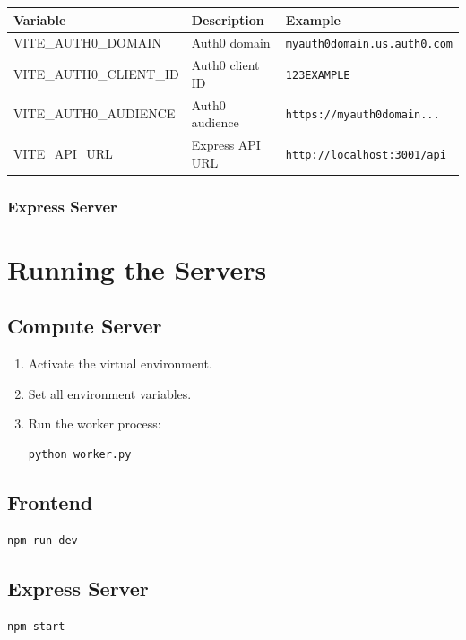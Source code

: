 \documentclass{article}
\begin{document}
\begin{tabularx}{\textwidth}{lXl}
\toprule
\textbf{Variable} & \textbf{Description} & \textbf{Example} \\
\midrule
VITE\_AUTH0\_DOMAIN & Auth0 domain & \texttt{myauth0domain.us.auth0.com} \\
VITE\_AUTH0\_CLIENT\_ID & Auth0 client ID & \texttt{123EXAMPLE} \\
VITE\_AUTH0\_AUDIENCE & Auth0 audience & \texttt{https://myauth0domain...} \\
VITE\_API\_URL & Express API URL & \texttt{http://localhost:3001/api} \\
\bottomrule
\end{tabularx}

\subsubsection*{Express Server}


\section{Running the Servers}

\subsection{Compute Server}
\begin{enumerate}
    \item Activate the virtual environment.
    \item Set all environment variables.
    \item Run the worker process:
\begin{Verbatim}[fontsize=\small]
python worker.py
\end{Verbatim}
\end{enumerate}

\subsection{Frontend}
\begin{Verbatim}[fontsize=\small]
npm run dev
\end{Verbatim}

\subsection{Express Server}
\begin{Verbatim}[fontsize=\small]
npm start
\end{Verbatim}
\end{document}
